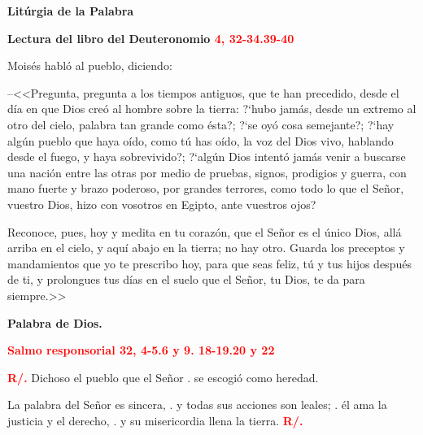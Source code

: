 \documentclass[12pt, letterpaper, spanish]{report}
\begin{document}
\newpage

\begin{center}
\Huge {\bfseries Lit\'urgia de la Palabra}
\end{center}

\Large {\bfseries Lectura del libro del Deuteronomio \hspace{1cm} \textcolor{red}{4, 32-34.39-40}} \newline

\Large Mois\'es habl\'o al pueblo, diciendo: \newline

--<<Pregunta, pregunta a los tiempos antiguos, que te han precedido, desde el d\'ia en que Dios
cre\'o al hombre sobre la tierra: ?`hubo jam\'as, desde un extremo al otro del cielo, palabra tan
grande como \'esta?; ?`se oy\'o cosa semejante?; ?`hay alg\'un pueblo que haya o\'ido, como t\'u has
o\'ido, la voz del Dios vivo, hablando desde el fuego, y haya sobrevivido?; ?`alg\'un Dios intent\'o
jam\'as venir a buscarse una naci\'on entre las otras por medio de pruebas, signos, prodigios y
guerra, con mano fuerte y brazo poderoso, por grandes terrores, como todo lo que el Se\~nor, vuestro
Dios, hizo con vosotros en Egipto, ante vuestros ojos? \newline

Reconoce, pues, hoy y medita en tu coraz\'on, que el Se\~nor es el \'unico Dios, all\'a arriba en el
cielo, y aqu\'i abajo en la tierra; no hay otro. Guarda los preceptos y mandamientos que yo te
prescribo hoy, para que seas feliz, t\'u y tus hijos despu\'es de ti, y prolongues tus d\'ias en el
suelo que el Se\~nor, tu Dios, te da para siempre.>> \newline

{\bfseries Palabra de Dios.} \newline

\newpage

\Large {\bfseries \textcolor{red}{Salmo responsorial \hspace{1cm} 32, 4-5.6 y 9. 18-19.20 y 22}} \newline

\Large {\bfseries \textcolor{red}{R/.}} \hspace{1cm} Dichoso el pueblo que el Se\~nor \newline
. \hspace{3cm} se escogi\'o como heredad. \newline

\hspace{2cm} La palabra del Se\~nor es sincera, \newline
. \hspace{2.5cm} y todas sus acciones son leales; \newline
. \hspace{2.5cm} \'el ama la justicia y el derecho, \newline
. \hspace{2.5cm} y su misericordia llena la tierra. \hspace{1cm} {\bfseries \textcolor{red}{R/.}} \newline
\end{document}
